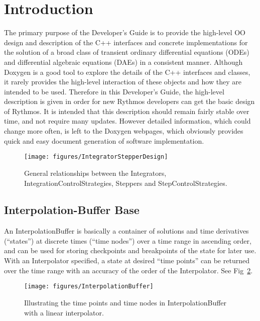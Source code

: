 \cleardoublepage{}

\section{Introduction}

The primary purpose of the Developer's Guide is to provide the high-level
OO design and description of the C++ interfaces and concrete implementations
for the solution of a broad class of transient ordinary differential
equations (ODEs) and differential algebraic equations (DAEs) in a
consistent manner. Although Doxygen is a good tool to explore the
details of the C++ interfaces and classes, it rarely provides the
high-level interaction of these objects and how they are intended
to be used. Therefore in this Developer's Guide, the high-level description
is given in order for new Rythmos developers can get the basic design
of Rythmos. It is intended that this description should remain fairly
stable over time, and not require many updates. However detailed information,
which could change more often, is left to the Doxygen webpages, which
obviously provides quick and easy document generation of software
implementation.

\begin{figure}
\centering{}\texttt{[image: figures/IntegratorStepperDesign]}\caption{General relationships between the Integrators, IntegrationControlStrategies,
Steppers and StepControlStrategies.\label{rythmos:fig:IntegratorStepperDesign}}
\end{figure}


\subsection{Interpolation-Buffer Base\label{rythmos:sec:InterpolationBufferBase}}

An InterpolationBuffer is basically a container of solutions and time
derivatives (``states'') at discrete times (``time nodes'') over
a time range in ascending order, and can be used for storing checkpoints
and breakpoints of the state for later use. With an Interpolator specified,
a state at desired ``time points'' can be returned over the time
range with an accuracy of the order of the Interpolator. See Fig~\ref{rythmos:fig:InterpolationBuffer}.
\begin{figure}

\begin{centering}
\texttt{[image: figures/InterpolationBuffer]}\caption{Illustrating the time points and time nodes in InterpolationBuffer
with a linear interpolator.\label{rythmos:fig:InterpolationBuffer}}
\par\end{centering}
\end{figure}

